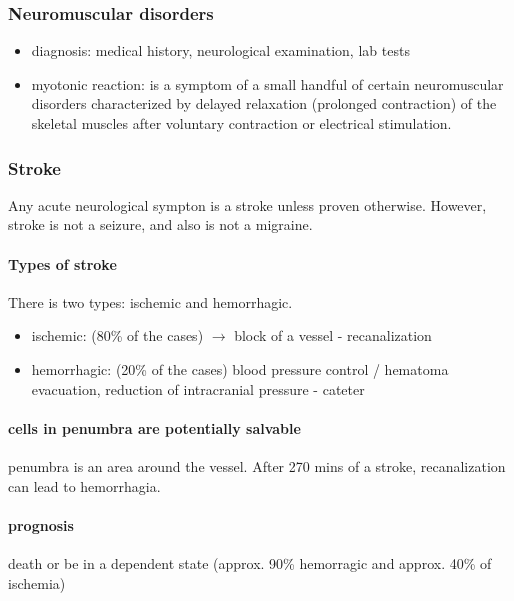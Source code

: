 \documentclass[12pt,article,oneside,a4paper]{memoir}
\begin{document}
\subsubsection{Neuromuscular disorders}
\begin{itemize}
\item diagnosis: medical history, neurological examination, lab tests
\item myotonic reaction: is a symptom of a small handful of certain
neuromuscular disorders characterized by delayed relaxation (prolonged
contraction) of the skeletal muscles after voluntary contraction or electrical
stimulation.
\end{itemize}

\subsubsection{Stroke} 
Any acute neurological sympton is a stroke unless proven otherwise. However,
stroke is not a seizure, and also is not a migraine.

\paragraph{Types of stroke}
There is two types: ischemic and hemorrhagic.

\begin{itemize}
\item ischemic: (80\% of the cases) $\rightarrow$ block of a vessel -
recanalization
\item hemorrhagic: (20\% of the cases) blood pressure control / hematoma
evacuation, reduction of intracranial pressure - cateter
\end{itemize}

\paragraph{cells in penumbra are potentially salvable}
penumbra is an area around the vessel. After 270 mins of a stroke,
recanalization can lead to  hemorrhagia.

\paragraph{prognosis}
death or be in a dependent state (approx. 90\% hemorragic and approx. 40\% of
ischemia)
\end{document}
